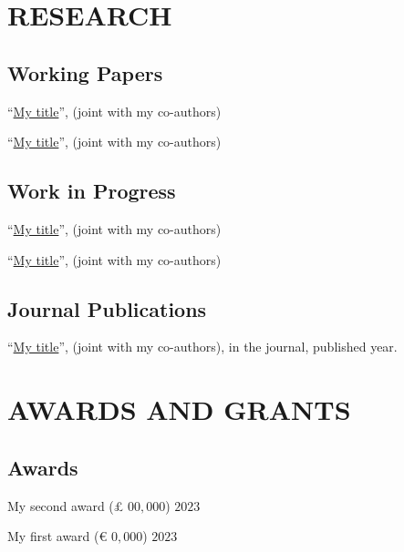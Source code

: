 \documentclass[11pt,]{article}
\providecommand{\tightlist}{%
  \setlength{\itemsep}{0pt}\setlength{\parskip}{0pt}}
\renewenvironment{itemize}{
  \begin{list}{}{
    \setlength{\leftmargin}{1.5em}
  }
}{
  \end{list}
}
\begin{document}
\section{RESEARCH}\label{research}

\subsection{Working Papers}\label{working-papers}

\begin{itemize}
\item
  ``\href{my\%20URL}{My title}'', (joint with my co-authors)
\item
  ``\href{my\%20URL}{My title}'', (joint with my co-authors)
\end{itemize}

\subsection{Work in Progress}\label{work-in-progress}

\begin{itemize}
\item
  ``\href{my\%20URL}{My title}'', (joint with my co-authors)
\item
  ``\href{my\%20URL}{My title}'', (joint with my co-authors)
\end{itemize}

\subsection{Journal Publications}\label{journal-publications}

\begin{itemize}
\tightlist
\item
  ``\href{my\%20URL}{My title}'', (joint with my co-authors), in the
  journal, published year.
\end{itemize}

\section{AWARDS AND GRANTS}\label{awards-and-grants}

\subsection{Awards}\label{awards}

\begin{itemize}
\tightlist
\item
  My second award (£ \(00,000\)) \hfill \(2023\)
\item
  My first award (€ \(0,000\)) \hfill \(2023\)
\end{itemize}
\end{document}
